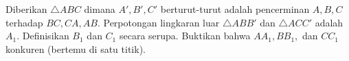 Diberikan $\triangle ABC$ dimana $A',B',C'$ berturut-turut adalah pencerminan $A,B,C$ terhadap $BC,CA,AB$. Perpotongan lingkaran luar $\triangle ABB'$ dan $\triangle ACC'$ adalah $A_1$. Definisikan $B_1$ dan $C_1$ secara serupa. Buktikan bahwa $AA_1,BB_1,$ dan $CC_1$ konkuren (bertemu di satu titik).